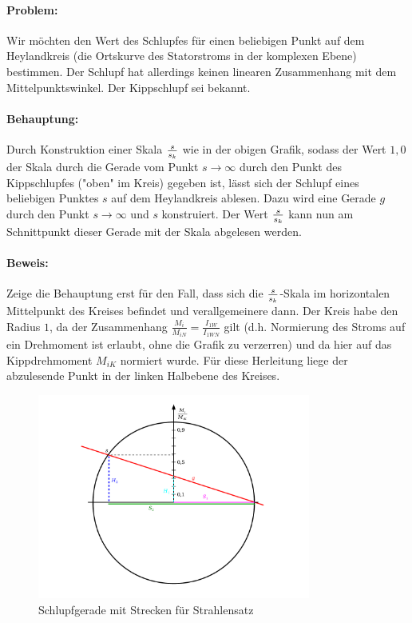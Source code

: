\documentclass[11pt]{article}
\begin{document}
\paragraph{Problem:} Wir möchten den Wert des Schlupfes für einen beliebigen Punkt auf dem Heylandkreis (die Ortskurve des Statorstroms in der komplexen Ebene) bestimmen. Der Schlupf hat allerdings keinen linearen Zusammenhang mit dem Mittelpunktswinkel. Der Kippschlupf sei bekannt.

\paragraph{Behauptung:} Durch Konstruktion einer Skala $s \over s_k$ wie in der obigen Grafik, sodass der Wert $1,0$ der Skala durch die Gerade vom Punkt $s \to \infty$ durch den Punkt des Kippschlupfes ("oben" im Kreis) gegeben ist, lässt sich der Schlupf eines beliebigen Punktes $s$ auf dem Heylandkreis ablesen. Dazu wird eine Gerade $g$ durch den Punkt $s \to \infty$ und $s$ konstruiert. Der Wert $s \over s_k$ kann nun am Schnittpunkt dieser Gerade mit der Skala abgelesen werden.

\paragraph{Beweis: } Zeige die Behauptung erst für den Fall, dass sich die $s \over s_k$-Skala im horizontalen Mittelpunkt des Kreises befindet und verallgemeinere dann. Der Kreis habe den Radius $1$, da der Zusammenhang $\frac{M_i}{M_{iN}} = \frac{I_{1W}}{I_{1WN}}$ gilt (d.h. Normierung des Stroms auf ein Drehmoment ist erlaubt, ohne die Grafik zu verzerren) und da hier auf das Kippdrehmoment $M_{iK}$ normiert wurde. Für diese Herleitung liege der abzulesende Punkt in der linken Halbebene des Kreises.

\begin{figure}[H]
	\centering
	\includegraphics[width=0.8\textwidth]{img/asynchronmaschine_schlupfgerade.pdf}
	\caption*{Schlupfgerade mit Strecken für Strahlensatz}
\end{figure}
\end{document}
